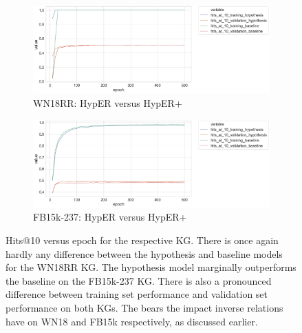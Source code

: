 
\begin{figure}[H]
	\begin{subfigure}[b]{.5\linewidth}
   		\centering
    		\includegraphics[width=1.0\linewidth, height=0.6\linewidth]{WN18RR_hits_at_10_Results}
		\captionsetup{justification=centering}
		\caption{WN18RR: HypER versus HypER+}
	\end{subfigure}
	\begin{subfigure}[b]{.5\linewidth}
   		\centering
		\includegraphics[width=1.0\linewidth, height=0.6\linewidth]{FB15k-237_hits_at_10_Results}
		\captionsetup{justification=centering}
		\caption{FB15k-237: HypER versus HypER+}
	\end{subfigure}
	\caption{Hits@10 versus epoch for the respective KG. There is once again hardly any difference between the hypothesis and baseline models for the WN18RR KG. The hypothesis model marginally outperforms the baseline on the FB15k-237 KG. There is also a pronounced difference between training set performance and validation set performance on both KGs. The bears the impact inverse relations have on WN18 and FB15k respectively, as discussed earlier.}
\end{figure}

